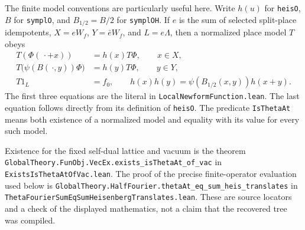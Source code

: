 \documentclass[11pt]{article}
\theoremstyle{definition}\newtheorem{definition}[theorem]{Definition}\newtheorem{remark}[theorem]{Remark}
\begin{document}
The finite model conventions are particularly useful here.  Write
$h(u)$ for \texttt{heisO}, $B$ for \texttt{symplO}, and
$B_{1/2}=B/2$ for \texttt{symplOH}.  If $e$ is the sum of
selected split-place idempotents, $X=eW_f$, $Y=\bar eW_f$, and
$L=e\Lambda$, then a normalized place model $T$ obeys
\[
 \begin{split}
 T(\Phi(\,\cdot+x))&=h(x)T\Phi,\qquad x\in X,\\
 T\bigl(\psi(B(\,\cdot,y))\Phi\bigr)&=h(y)T\Phi,
                                      \qquad y\in Y,\\
 T1_L&=f_0,\qquad
 h(x)h(y)=\psi(B_{1/2}(x,y))h(x+y).
 \end{split}
 \tag{A12a}
\]
The first three equations are the literal
 in
\nolinkurl{LocalNewformFunction.lean}.  The last equation follows
directly from its definition of \texttt{heisO}.  The predicate
\texttt{IsThetaAt} means both existence of a normalized model
and equality with its value for every such model.

Existence for the fixed self-dual lattice and vacuum is the
theorem \nolinkurl{GlobalTheory.FunObj.VecEx.exists_isThetaAt_of_vac}
in
\nolinkurl{ExistsIsThetaAtOfVac.lean}.  The proof of the precise
finite-operator evaluation used below is
\nolinkurl{GlobalTheory.HalfFourier.thetaAt_eq_sum_heis_translates}
in
\nolinkurl{ThetaFourierSumEqSumHeisenbergTranslates.lean}.
These are source locators and a check of the displayed
mathematics, not a claim that the recovered tree was compiled.
\end{document}
